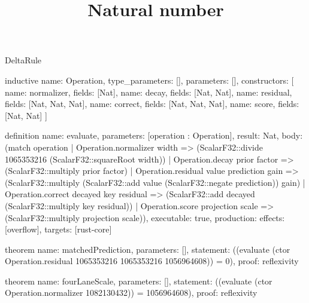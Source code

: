 \begin{lexlean}{DeltaRule}
\title{Natural number}
\begin{semanticmodule}
inductive{
  name: Operation,
  type_parameters: [],
  parameters: [],
  constructors: [
    {name: normalizer, fields: [Nat]},
    {name: decay, fields: [Nat, Nat]},
    {name: residual, fields: [Nat, Nat, Nat]},
    {name: correct, fields: [Nat, Nat, Nat]},
    {name: score, fields: [Nat, Nat]}
  ]
}

definition{
  name: evaluate,
  parameters: [operation : Operation],
  result: Nat,
  body: (match operation
    | Operation.normalizer width => (ScalarF32::divide 1065353216 (ScalarF32::squareRoot width))
    | Operation.decay prior factor => (ScalarF32::multiply prior factor)
    | Operation.residual value prediction gain => (ScalarF32::multiply (ScalarF32::add value (ScalarF32::negate prediction)) gain)
    | Operation.correct decayed key residual => (ScalarF32::add decayed (ScalarF32::multiply key residual))
    | Operation.score projection scale => (ScalarF32::multiply projection scale)),
  executable: true,
  production: {effects: [overflow], targets: [rust-core]}
}

theorem{
  name: matchedPrediction,
  parameters: [],
  statement: ((evaluate (ctor Operation.residual 1065353216 1065353216 1056964608)) = 0),
  proof: reflexivity{}
}

theorem{
  name: fourLaneScale,
  parameters: [],
  statement: ((evaluate (ctor Operation.normalizer 1082130432)) = 1056964608),
  proof: reflexivity{}
}
\end{semanticmodule}
\end{lexlean}

